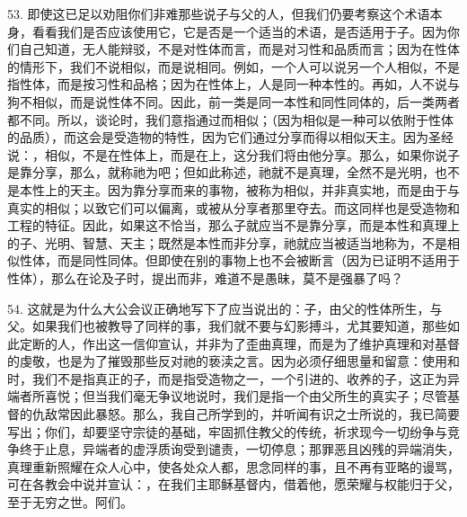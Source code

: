 53. 即使这已足以劝阻你们非难那些说子与父的人，但我们仍要考察这个术语本身，看看我们是否应该使用它，它是否是一个适当的术语，是否适用于子。因为你们自己知道，无人能辩驳，不是对性体而言，而是对习性和品质而言；因为在性体的情形下，我们不说相似，而是说相同。例如，一个人可以说另一个人相似，不是指性体，而是按习性和品格；因为在性体上，人是同一种本性的。再如，人不说与狗不相似，而是说性体不同。因此，前一类是同一本性和同性同体的，后一类两者都不同。所以，谈论时，我们意指通过而相似；（因为相似是一种可以依附于性体的品质），而这会是受造物的特性，因为它们通过分享而得以相似天主。因为圣经说：，相似，不是在性体上，而是在上，这分我们将由他分享。那么，如果你说子是靠分享，那么，就称祂为吧；但如此称述，祂就不是真理，全然不是光明，也不是本性上的天主。因为靠分享而来的事物，被称为相似，并非真实地，而是由于与真实的相似；以致它们可以偏离，或被从分享者那里夺去。而这同样也是受造物和工程的特征。因此，如果这不恰当，那么子就应当不是靠分享，而是本性和真理上的子、光明、智慧、天主；既然是本性而非分享，祂就应当被适当地称为，不是相似性体，而是同性同体。但即使在别的事物上也不会被断言（因为已证明不适用于性体），那么在论及子时，提出而非，难道不是愚昧，莫不是强暴了吗？\par

54. 这就是为什么大公会议正确地写下了应当说出的：子，由父的性体所生，与父。如果我们也被教导了同样的事，我们就不要与幻影搏斗，尤其要知道，那些如此定断的人，作出这一信仰宣认，并非为了歪曲真理，而是为了维护真理和对基督的虔敬，也是为了摧毁那些反对祂的亵渎之言。因为必须仔细思量和留意：使用和时，我们不是指真正的子，而是指受造物之一，一个引进的、收养的子，这正为异端者所喜悦；但当我们毫无争议地说时，我们是指一个由父所生的真实子；尽管基督的仇敌常因此暴怒。那么，我自己所学到的，并听闻有识之士所说的，我已简要写出；你们，却要坚守宗徒的基础，牢固抓住教父的传统，祈求现今一切纷争与竞争终于止息，异端者的虚浮质询受到谴责，一切停息；那罪恶且凶残的异端消失，真理重新照耀在众人心中，使各处众人都，思念同样的事，且不再有亚略的谩骂，可在各教会中说并宣认：，在我们主耶稣基督内，借着他，愿荣耀与权能归于父，至于无穷之世。阿们。\par

